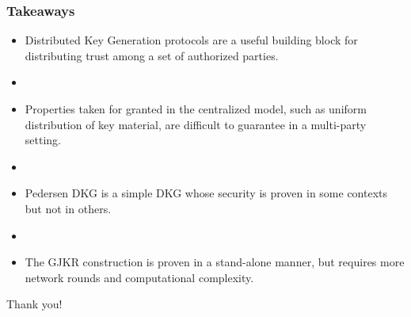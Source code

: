 \documentclass[hyperref={pdfpagelabels=true},table,dvipsnames,14pt,aspectratio=169]{beamer}
\begin{document}
\begin{frame}
  \centering
{}
\end{frame}


\begin{frame}
  \frametitle{Takeaways}

  \begin{itemize}
    \item Distributed Key Generation protocols are a useful building block for distributing trust among a set of authorized parties.
    \item[]
    \item<2-> Properties taken for granted in the centralized model, such as uniform distribution of key material, are difficult to guarantee in a multi-party setting.
    \item[]
    \item<3-> Pedersen DKG is a simple DKG whose security is proven in some contexts but not in others.
    \item[]
    \item<4-> The GJKR construction is proven in a stand-alone manner, but requires more network rounds and computational complexity.
  \end{itemize}
\end{frame}

\begin{frame}

  \huge
  \centering
  Thank you!
\end{frame}
\end{document}
